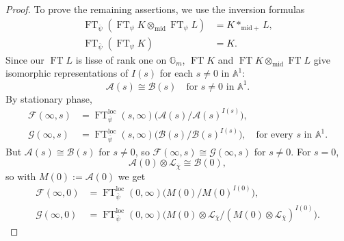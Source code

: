 \begin{proof}
To prove the remaining assertions, we use the inversion formulas
\[
\begin{aligned}
  \operatorname{FT}_{\overline{\psi}}
  (\operatorname{FT}_{\psi}K\otimes_{\mathrm{mid}}\operatorname{FT}_{\psi}L)
  &=
  K*_{\mathrm{mid}+}L,\\
  \operatorname{FT}_{\overline{\psi}}(\operatorname{FT}_{\psi}K)&=K.
\end{aligned}
\]
Since our \(\operatorname{FT}L\) is lisse of rank one on \(\mathbb{G}_m\),
\(\operatorname{FT}K\) and \(\operatorname{FT}K\otimes_{\mathrm{mid}}
\operatorname{FT}L\) give isomorphic representations of \(I(s)\) for each
\(s\ne0\) in \(\mathbb{A}^1\):
\[
  \mathcal{A}(s)\cong\mathcal{B}(s)\quad
  \text{for }s\ne0\text{ in }\mathbb{A}^1.
\]
By stationary phase,
\[
\begin{aligned}
  \mathcal{F}(\infty,s)
  &=
  \operatorname{FT}_{\overline{\psi}}^{\mathrm{loc}}(s,\infty)
  \bigl(\mathcal{A}(s)/\mathcal{A}(s)^{I(s)}\bigr),\\
  \mathcal{G}(\infty,s)
  &=
  \operatorname{FT}_{\overline{\psi}}^{\mathrm{loc}}(s,\infty)
  \bigl(\mathcal{B}(s)/\mathcal{B}(s)^{I(s)}\bigr),
  \quad\text{for every }s\text{ in }\mathbb{A}^1.
\end{aligned}
\]
But \(\mathcal{A}(s)\cong\mathcal{B}(s)\) for \(s\ne0\), so
\(\mathcal{F}(\infty,s)\cong\mathcal{G}(\infty,s)\) for \(s\ne0\). For \(s=0\),
\[
  \mathcal{A}(0)\otimes\mathcal{L}_{\overline{\chi}}\cong\mathcal{B}(0),
\]
so with \(M(0):=\mathcal{A}(0)\) we get
\[
\begin{aligned}
  \mathcal{F}(\infty,0)
  &=
  \operatorname{FT}_{\overline{\psi}}^{\mathrm{loc}}(0,\infty)
  \bigl(M(0)/M(0)^{I(0)}\bigr),\\
  \mathcal{G}(\infty,0)
  &=
  \operatorname{FT}_{\overline{\psi}}^{\mathrm{loc}}(0,\infty)
  \bigl(M(0)\otimes\mathcal{L}_{\overline{\chi}}
  /(M(0)\otimes\mathcal{L}_{\overline{\chi}})^{I(0)}\bigr).
\end{aligned}
\]
\end{proof}

